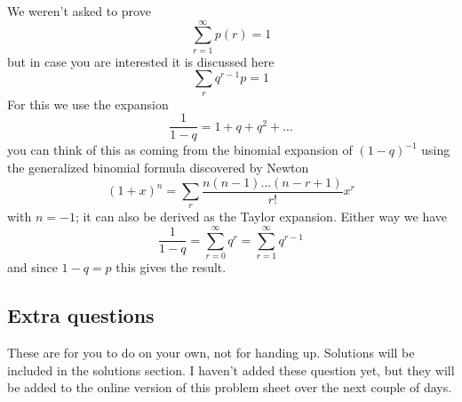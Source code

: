 \documentclass[11pt,a4paper]{scrartcl}
\begin{document}
\begin{enumerate}
We weren't asked to prove
\begin{equation}
\sum_{r=1}^\infty p(r)=1
\end{equation}
but in case you are interested it is discussed here
\begin{equation}
\sum_r q^{r-1}p=1
\end{equation}
For this we use the expansion
\begin{equation}
\frac{1}{1-q}=1+q+q^2+\ldots
\end{equation}
you can think of this as coming from the binomial expansion of $(1-q)^{-1}$ using the generalized binomial formula discovered by Newton
\begin{equation}
(1+x)^n=\sum_r \frac{n(n-1)\ldots (n-r+1)}{r!}x^r
\end{equation}
with $n=-1$; it can also be derived as the Taylor expansion. Either way we have
\begin{equation}
\frac{1}{1-q}=\sum_{r=0}^\infty q^r=\sum_{r=1}^\infty q^{r-1}
\end{equation}
and since $1-q=p$ this gives the result.

\end{enumerate}

\subsection*{Extra questions}


These are for you to do on your own, not for handing up. Solutions will be included in the solutions section. I haven't added these question yet, but they will be added to the online version of this problem sheet over the next couple of days.
\end{document}
